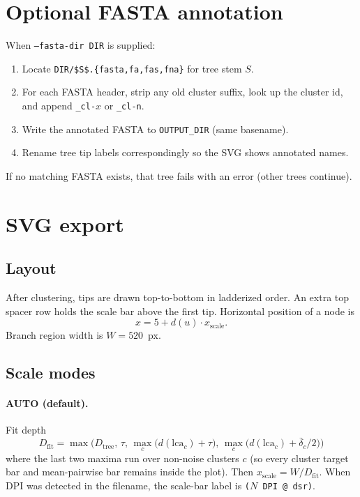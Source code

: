\documentclass[11pt,a4paper]{article}
\begin{document}
\section{Optional FASTA annotation}
\label{sec:fasta}

When \texttt{--fasta-dir DIR} is supplied:
\begin{enumerate}
  \item Locate \verb|DIR/$S$.{fasta,fa,fas,fna}| for tree stem $S$.
  \item For each FASTA header, strip any old cluster suffix, look up the
        cluster id, and append \texttt{\_cl-}$x$ or \texttt{\_cl-n}.
  \item Write the annotated FASTA to \texttt{OUTPUT\_DIR} (same basename).
  \item Rename tree tip labels correspondingly so the SVG shows annotated names.
\end{enumerate}
If no matching FASTA exists, that tree fails with an error
(other trees continue).

\section{SVG export}
\label{sec:svg}

\subsection{Layout}
After clustering, tips are drawn top-to-bottom in ladderized order.
An extra top spacer row holds the scale bar above the first tip.
Horizontal position of a node is
\[
  x=5+d(u)\cdot x_{\mathrm{scale}}.
\]
Branch region width is $W=520$~px.

\subsection{Scale modes}
\paragraph{AUTO (default).}
Fit depth
\[
  D_{\mathrm{fit}}=\max\bigl(D_{\mathrm{tree}},\,\tau,\,
  \max_c\bigl(d(\mathrm{lca}_c)+\tau\bigr),\,
  \max_c\bigl(d(\mathrm{lca}_c)+\overline{\delta}_c/2\bigr)\bigr)
\]
where the last two maxima run over non-noise clusters $c$ (so every cluster
target bar and mean-pairwise bar remains inside the plot). Then
$x_{\mathrm{scale}}=W/D_{\mathrm{fit}}$.
When DPI was detected in the filename, the scale-bar label is
\texttt{($N$ DPI @ dsr)}.
\end{document}
